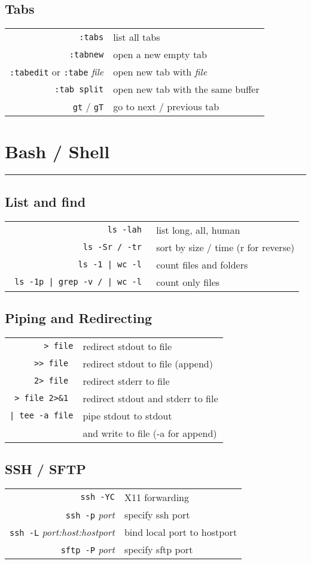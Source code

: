 \begin{multicols*}{3}
\subsection*{Tabs}
\begin{tabular}{@{}rl@{}}
  \verb|:tabs| & list all tabs \\
  \verb|:tabnew| & open a new empty tab \\
  \verb|:tabedit| or \verb|:tabe| \itshape{file} & open new tab with \itshape{file} \\
  \verb|:tab split| & open new tab with the same buffer \\
  \verb|gt| / \verb|gT| & go to next / previous tab
\end{tabular}

\section*{Bash / Shell}
\hrule\vspace*{2pt}
\subsection*{List and find}
\begin{tabular}{@{}rl@{}}
\verb| ls -lah | & list long, all, human \\
\verb| ls -Sr / -tr | & sort by size / time (r for reverse) \\
\verb= ls -1 | wc -l = & count files and folders \\
\verb= ls -1p | grep -v / | wc -l = & count only files
\end{tabular}
\subsection*{Piping and Redirecting}
\begin{tabular}{@{}rl@{}}
\verb|> file| & redirect stdout to file \\
\verb|>> file | & redirect stdout to file (append) \\
\verb|2> file | & redirect stderr to file \\
\verb|> file 2>&1 | & redirect stdout and stderr to file \\
\verb=| tee -a file= & pipe stdout to stdout \\ & and write to file (-a for append) \\
\end{tabular}
\subsection*{SSH / SFTP}
\begin{tabular}{@{}rl@{}}
  \verb|ssh -YC| & X11 forwarding \\
  \verb|ssh -p| \itshape{port} & specify ssh port \\
  \verb|ssh -L| \itshape{port:host:hostport} & bind local port to hostport \\
  \verb|sftp -P| \itshape{port} & specify sftp port
\end{tabular}

\end{multicols*}
